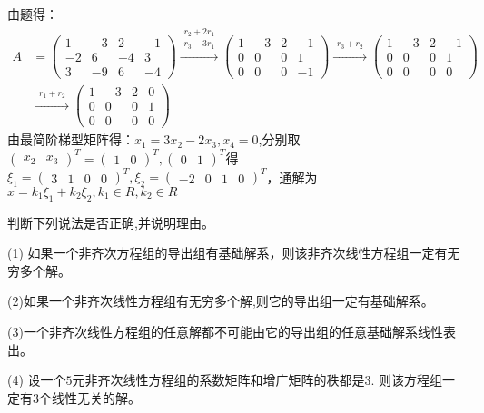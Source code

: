 \documentclass[a4paper]{report}
\begin{document}
\begin{jie}
由题得：
\begin{align*}A&=
\begin{pmatrix}
1&-3&2&-1\\
-2&6&-4&3\\
3&-9&6&-4
\end{pmatrix}
\xrightarrow{\substack{r_2+2r_1\\ r_3-3r_1}}{
\begin{pmatrix}
1&-3&2&-1\\
0&0&0&1\\
0&0&0&-1
\end{pmatrix}
}\xrightarrow{\substack{ r_3+r_2}}{
\begin{pmatrix}
1&-3&2&-1\\
0&0&0&1\\
0&0&0&0
\end{pmatrix}
}\\
&\xrightarrow{\substack{ r_1+r_2}}{
\begin{pmatrix}
1&-3&2&0\\
0&0&0&1\\
0&0&0&0
\end{pmatrix}
}
\end{align*}
由最简阶梯型矩阵得：$x_1=3x_2-2x_3,x_4=0$,分别取$
\begin{pmatrix}
x_2&x_3
\end{pmatrix}^T=\begin{pmatrix}
1&0
\end{pmatrix}^T,\begin{pmatrix}
0&1
\end{pmatrix}^T
$得$
\xi_1=
\begin{pmatrix}
3&1&0&0
\end{pmatrix}^T
,\xi_2=
\begin{pmatrix}
-2&0&1&0
\end{pmatrix}^T
$，通解为
$
x=k_1\xi_1+k_2\xi_2,k_1\in R,k_2\in R
$
\end{jie}

\EX 判断下列说法是否正确,并说明理由。

(1) 如果一个非齐次方程组的导出组有基础解系，则该非齐次线性方程组一定有无穷多个解。

(2)如果一个非齐次线性方程组有无穷多个解,则它的导出组一定有基础解系。

(3)一个非齐次线性方程组的任意解都不可能由它的导出组的任意基础解系线性表出。

(4) 设一个$5$元非齐次线性方程组的系数矩阵和增广矩阵的秩都是$3$. 则该方程组一定有$3$个线性无关的解。
\end{document}

